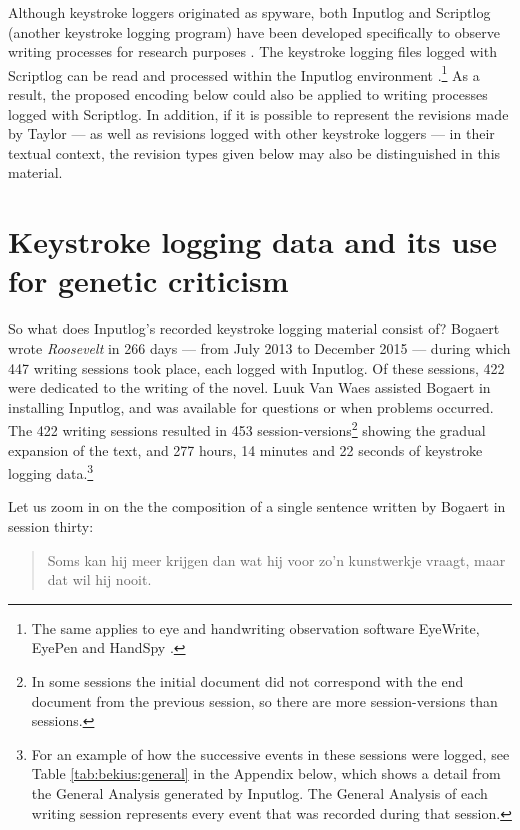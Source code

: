 \begin{paper}
Although keystroke loggers originated as spyware, both Inputlog and Scriptlog (another
keystroke logging program) have been
developed specifically to observe writing processes for research
purposes \citep{wengelin_combined_2009}. The keystroke logging files logged with Scriptlog can be read
and processed within the Inputlog
environment \citep{van_hoorenbeeck_generic_2015}.\footnote{The same applies to
  eye and handwriting observation software EyeWrite, EyePen and HandSpy
  \citep{van_hoorenbeeck_generic_2015}.} As a result, the proposed encoding
below could also be applied to writing processes logged with Scriptlog.
In addition, if it is possible to represent the revisions made by Taylor
--- as well as revisions logged with other keystroke loggers --- in their
textual context, the revision types given below may also be
distinguished in this material.
  
\section{Keystroke logging data and its use for genetic
criticism}

So what does Inputlog's recorded keystroke logging material consist of?
Bogaert wrote \emph{Roosevelt} in 266 days --- from July 2013 to December 2015 --- during which 447 writing sessions took place, each logged with Inputlog. Of these sessions, 422 were dedicated to the writing of the novel. Luuk Van Waes assisted Bogaert in installing Inputlog, and was available for questions or when problems occurred. The 422 writing sessions resulted in 453 session-versions\footnote{In some sessions the initial document did not
  correspond with the end document from the previous session, so there
  are more session-versions than sessions.} showing the gradual expansion of the text, and 277 hours, 14 minutes and 22 seconds of keystroke logging data.\footnote{For an example of how the successive events in these sessions were logged, see Table \ref{tab:bekius:general} in the Appendix below, which shows a detail from
the General Analysis generated by Inputlog. The General Analysis of each writing session represents every event that was recorded during that  session.}

Let us zoom in on the the composition of a single sentence written by Bogaert in session thirty: 

\begin{quote}
Soms kan hij meer
krijgen dan wat hij voor zo'n kunstwerkje vraagt, maar dat wil hij
nooit. 


\end{quote}
\end{paper}
